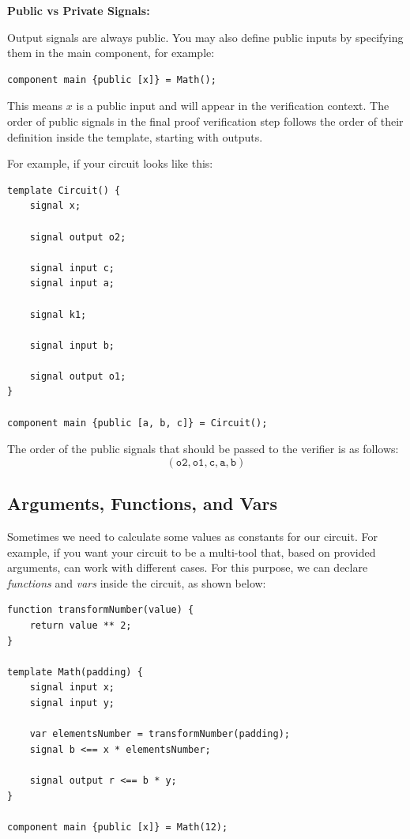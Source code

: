 \documentclass[../../book.tex]{subfiles}
\begin{document}
\vspace{0.5cm}

\textbf{Public vs Private Signals:}

Output signals are always public.
You may also define public inputs by specifying them in the main component, for example:

\begin{lstlisting}[language=Circom,numbers=none]
component main {public [x]} = Math();
\end{lstlisting}

This means $x$ is a public input and will appear in the verification context.
The order of public signals in the final proof verification step follows the order of their definition inside the template, starting with outputs.

For example, if your circuit looks like this:
\begin{lstlisting}[language=Circom]
template Circuit() {
    signal x;

    signal output o2;

    signal input c;
    signal input a;

    signal k1;

    signal input b;

    signal output o1;
}

component main {public [a, b, c]} = Circuit();
\end{lstlisting}

The order of the public signals that should be passed to the verifier is as follows:
\[ (\texttt{o2}, \texttt{o1}, \texttt{c}, \texttt{a}, \texttt{b}) \]

\subsection{Arguments, Functions, and Vars}

Sometimes we need to calculate some values as constants for our circuit.
For example, if you want your circuit to be a multi-tool that, based on provided arguments, can work with different cases.
For this purpose, we can declare \textit{functions} and \textit{vars} inside the circuit, as shown below:

\begin{lstlisting}[language=Circom]
function transformNumber(value) {
    return value ** 2;
}

template Math(padding) {
    signal input x;
    signal input y;

    var elementsNumber = transformNumber(padding);
    signal b <== x * elementsNumber;

    signal output r <== b * y;
}

component main {public [x]} = Math(12);
\end{lstlisting}
\end{document}
